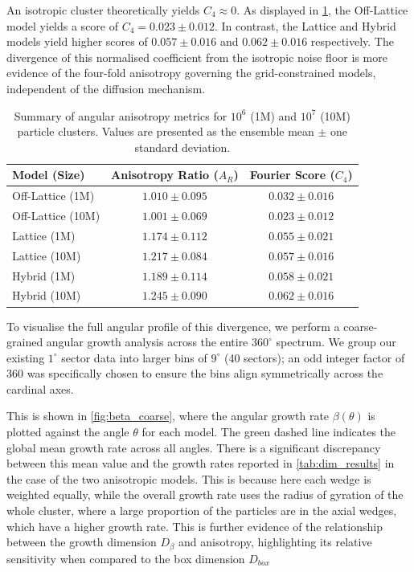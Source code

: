 \documentclass[12pt, a4paper, oneside]{report}
\theoremstyle{remark}
\begin{document}
An isotropic cluster theoretically yields $C_4 \approx 0$. As displayed in \cref{tab:anisotropy_stats}, the Off-Lattice model yields a score of $C_4 = 0.023 \pm 0.012$. In contrast, the Lattice and Hybrid models yield higher scores of $0.057 \pm 0.016$ and $0.062 \pm 0.016$ respectively. The divergence of this normalised coefficient from the isotropic noise floor is more evidence of the four-fold anisotropy governing the grid-constrained models, independent of the diffusion mechanism.
\begin{table}[htbp]
    \centering
    \caption{Summary of angular anisotropy metrics for $10^6$ (1M) and $10^7$ (10M) particle clusters. Values are presented as the ensemble mean $\pm$ one standard deviation.}
    \label{tab:anisotropy_stats}
    \begin{tabular}{lcc}
        \toprule
        \textbf{Model (Size)} & \textbf{Anisotropy Ratio ($A_R$)} & \textbf{Fourier Score ($C_4$)} \\
        \midrule
        Off-Lattice (1M)  & $1.010 \pm 0.095$ & $0.032 \pm 0.016$ \\
        Off-Lattice (10M) & $1.001 \pm 0.069$ & $0.023 \pm 0.012$ \\
        \midrule
        Lattice (1M)      & $1.174 \pm 0.112$ & $0.055 \pm 0.021$ \\
        Lattice (10M)     & $1.217 \pm 0.084$ & $0.057 \pm 0.016$ \\
        \midrule
        Hybrid (1M)       & $1.189 \pm 0.114$ & $0.058 \pm 0.021$ \\
        Hybrid (10M)      & $1.245 \pm 0.090$ & $0.062 \pm 0.016$ \\
        \bottomrule
    \end{tabular}
\end{table}

To visualise the full angular profile of this divergence, we perform a coarse-grained angular growth analysis across the entire $360^\circ$ spectrum. We group our existing $1^\circ$ sector data into larger bins of $9^\circ$ (40 sectors); an odd integer factor of 360 was specifically chosen to ensure the bins align symmetrically across the cardinal axes.

This is shown in \cref{fig:beta_coarse}, where the angular growth rate $\beta(\theta)$ is plotted against the angle $\theta$ for each model. The green dashed line indicates the global mean growth rate across all angles. There is a significant discrepancy between this mean value and the growth rates reported in \cref{tab:dim_results} in the case of the two anisotropic models. This is because here each wedge is weighted equally, while the overall growth rate uses the radius of gyration of the whole cluster, where a large proportion of the particles are in the axial wedges, which have a higher growth rate. 
This is further evidence of the relationship between the growth dimension $D_{\beta}$ and anisotropy, highlighting its relative sensitivity when compared to the box dimension $D_{box}$
\end{document}
